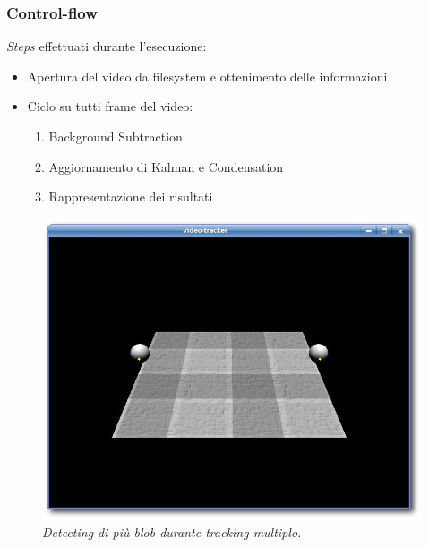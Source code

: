 \documentclass{beamer}
\begin{document}
\begin{frame}[fragile]
\frametitle{Control-flow}

\textit{Steps} effettuati durante l'esecuzione:

\begin{itemize}
\item Apertura del video da filesystem e ottenimento delle informazioni
\item Ciclo su tutti frame del video:
	\begin{enumerate}
	\item Background Subtraction
	\item Aggiornamento di Kalman e Condensation
	\item Rappresentazione dei risultati 
	\end{enumerate}
\end{itemize}

\begin{figure}[hb]
\centering
	\includegraphics[scale=0.2]{../relazione/figure/doppiascelta.jpg}
\caption[Esempio di scelta tra due blob]{\textit{Detecting di più blob durante tracking multiplo.}\label{fig:scelta2blob}}
\end{figure}


%	
%		
%			
%	
%			



\end{frame}
\end{document}
